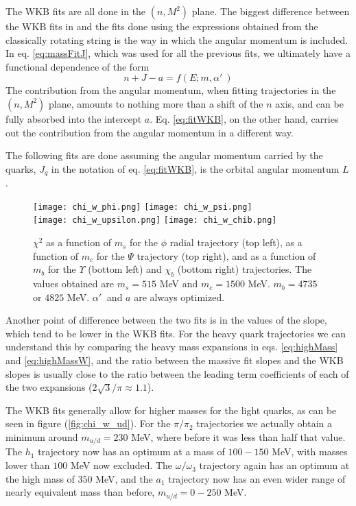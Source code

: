 \documentclass[11pt,a4]{article}
\def\be{\begin{equation}}
\def\ee{\end{equation}}
\newcommand{\alp}{\ensuremath{\alpha'\:}}
\newcommand{\mud}{m_{u/d}}
\begin{document}
The WKB fits are all done in the \((n,M^2)\) plane. The biggest difference between the WKB fits in and the fits done using the expressions obtained from the classically rotating string is the way in which the angular momentum is included. In eq. \eqref{eq:massFitJ}, which was used for all the previous fits, we ultimately have a functional dependence of the form
	\be n + J - a = f(E;m,\alp) \ee
The contribution from the angular momentum, when fitting trajectories in the \((n,M^2)\) plane, amounts to nothing more than a shift of the \(n\) axis, and can be fully absorbed into the intercept \(a\). Eq. \eqref{eq:fitWKB}, on the other hand, carries out the contribution from the angular momentum in a different way.

The following fits are done assuming the angular momentum carried by the quarks, \(J_q\) in the notation of eq. \eqref{eq:fitWKB}, is the orbital angular momentum \(L\).

\begin{figure}[t!] \centering
						\texttt{[image: chi\_w\_phi.png]}	 \hfill
						\texttt{[image: chi\_w\_psi.png]} \\
						\texttt{[image: chi\_w\_upsilon.png]}	 \hfill
						\texttt{[image: chi\_w\_chib.png]}
						\caption{\label{fig:chi_w_scb} \(\chi^2\) as a function of \(m_s\) for the \(\phi\) radial trajectory (top left), as a function of \(m_c\) for the \(\Psi\) trajectory (top right), and as a function of \(m_b\) for the \(\Upsilon\) (bottom left) and \(\chi_b\) (bottom right) trajectories. The values obtained are \(m_s = 515\) MeV and \(m_c = 1500\) MeV. \(m_b = 4735\) or \(4825\) MeV. \(\alp\) and \(a\) are always optimized.}
				\end{figure}

Another point of difference between the two fits is in the values of the slope, which tend to be lower in the WKB fits. For the heavy quark trajectories we can understand this by comparing the heavy mass expansions in eqs. \eqref{eq:highMass} and \eqref{eq:highMassW}, and the ratio between the massive fit slopes and the WKB slopes is usually close to the ratio between the leading term coefficients of each of the two expansions (\(2\sqrt{3}/\pi \approx 1.1\)).

The WKB fits generally allow for higher masses for the light quarks, as can be seen in figure (\ref{fig:chi_w_ud}). For the \(\pi/\pi_2\) trajectories we actually obtain a minimum around \(\mud = 230\) MeV, where before it was less than half that value. The \(h_1\) trajectory now has an optimum at a mass of \(100-150\) MeV, with masses lower than \(100\) MeV now excluded. The \(\omega/\omega_3\) trajectory again has an optimum at the high mass of \(350\) MeV, and the \(a_1\) trajectory now has an even wider range of nearly equivalent mass than before, \(\mud = 0-250\) MeV.
				
\end{document}

